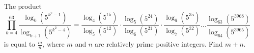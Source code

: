 The product
$$\prod_{k=4}^{63} \frac{\log_k \left(5^{k^2 - 1}\right)}{\log_{k+1} \left(5^{k^2 - 4}\right)} = \frac{\log_4 (5^{15})}{\log_5 (5^{12})} \cdot \frac{\log_5 (5^{24})}{\log_6 (5^{21})} \cdot \frac{\log_6 (5^{35})}{\log_7 (5^{32})} \dots \frac{\log_{63} (5^{3968})}{\log_{64} (5^{3965})}$$
is equal to $\frac{m}{n}$, where $m$ and $n$ are relatively prime positive integers. Find $m + n$.
